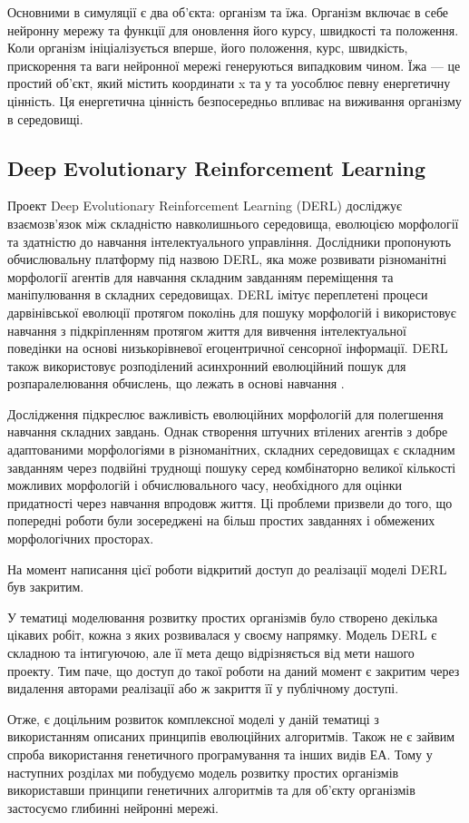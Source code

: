 Основними в симуляції є два об'єкта: організм та їжа. 
Організм включає в себе нейронну мережу та функції для оновлення його курсу,
швидкості та положення. 
Коли організм ініціалізується вперше, його положення, курс, швидкість,
прискорення та ваги нейронної мережі генеруються випадковим чином.
Їжа --- це простий об'єкт, який містить координати x та у та уособлює певну 
енергетичну цінність. Ця енергетична цінність безпосередньо впливає на 
виживання організму в середовищі.

\subsection{Deep Evolutionary Reinforcement Learning}

Проект Deep Evolutionary Reinforcement Learning (DERL) 
\cite{guptaEmbodiedIntelligenceLearning2021} досліджує взаємозв'язок 
між складністю навколишнього середовища, еволюцією морфології та здатністю до 
навчання інтелектуального управління. Дослідники пропонують обчислювальну платформу 
під назвою DERL, яка може розвивати різноманітні морфології агентів для 
навчання складним завданням переміщення та маніпулювання в складних середовищах. 
DERL імітує переплетені процеси дарвінівської еволюції протягом поколінь для пошуку 
морфологій і використовує навчання з підкріпленням протягом життя для вивчення 
інтелектуальної поведінки на основі низькорівневої егоцентричної сенсорної інформації.
DERL також використовує розподілений асинхронний еволюційний пошук для 
розпаралелювання обчислень, що лежать в основі навчання
\cite{guptaEmbodiedIntelligenceLearning2021}.

Дослідження підкреслює важливість еволюційних морфологій для полегшення 
навчання складних завдань. 
Однак створення штучних втілених агентів з добре адаптованими морфологіями в
різноманітних, складних середовищах є складним завданням через подвійні труднощі 
пошуку серед комбінаторно великої кількості можливих морфологій і 
обчислювального часу, необхідного для оцінки придатності через навчання впродовж життя.
Ці проблеми призвели до того, що попередні роботи були зосереджені на більш 
простих завданнях і обмежених морфологічних просторах.

На момент написання цієї роботи відкритий доступ до реалізації моделі DERL
був закритим.


\chapconclude{\ref{chap:review}}

У тематиці моделювання розвитку простих організмів було створено
декілька цікавих робіт, кожна з яких розвивалася у своєму напрямку.
Модель DERL є складною та інтигуючою, але її мета дещо відрізняється від мети
нашого проекту. Тим паче, що доступ до такої роботи на даний момент є
закритим через видалення авторами реалізації або ж закриття її у публічному доступі.

Отже, є доцільним розвиток комплексної моделі у даній тематиці
з використанням описаних принципів еволюційних алгоритмів.
Також не є зайвим спроба використання генетичного програмування та інших
видів ЕА. Тому у наступних розділах ми побудуємо модель розвитку простих організмів
використавши принципи генетичних алгоритмів та для об'єкту організмів
застосуємо глибинні нейронні мережі.
